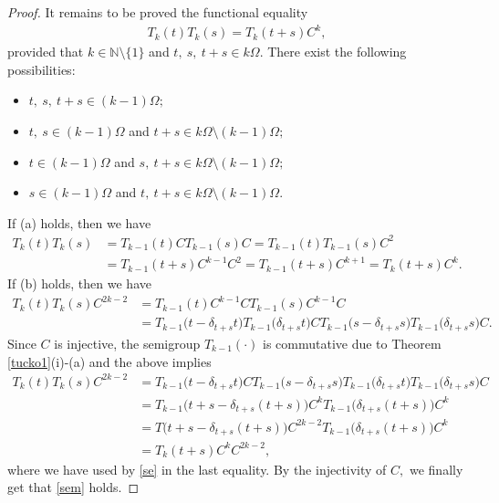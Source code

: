 \documentclass{amsart}
\theoremstyle{definition}
\theoremstyle{remark}
\numberwithin{equation}{section}
\begin{document}
\begin{proof}
It remains to be proved the functional equality
\begin{align}\label{sem}
T_{k}(t)T_{k}(s)=T_{k}(t+s)C^{k},
\end{align}
provided that $k\in {\mathbb N} \setminus \{1\}$ and $t,\ s,\ t+s\in k\Omega.$ There exist the following possibilities:
\begin{itemize}
\item[(a)] $t,\ s,\ t+s\in (k-1)\Omega;$
\item[(b)] $t,\ s\in (k-1)\Omega$ and $t+s\in k\Omega \setminus (k-1) \Omega;$
\item[(c)] $t \in (k-1)\Omega$ and $s,\ t+s\in k\Omega \setminus (k-1) \Omega;$
\item[(d)] $s\in (k-1)\Omega$ and $t,\ t+s\in k\Omega \setminus (k-1) \Omega.$
\end{itemize}
If (a) holds, then we have
\begin{align*}
T_{k}(t)T_{k}(s)& =T_{k-1}(t)C T_{k-1}(s)C=T_{k-1}(t)  T_{k-1}(s)C^{2}
\\& =T_{k-1}(t+s)C^{k-1}C^{2}=T_{k-1}(t+s)C^{k+1}=T_{k}(t+s)C^{k}.
\end{align*}
If (b) holds, then we have
\begin{align*}
T_{k}(t)T_{k}(s)C^{2k-2}&=T_{k-1}(t)C^{k-1} C T_{k-1}(s)C^{k-1} C\\&=T_{k-1}\bigl(t-\delta_{t+s}t \bigr)T_{k-1}\bigl(\delta_{t+s}t \bigr)CT_{k-1}\bigl(s-\delta_{t+s}s \bigr)T_{k-1}\bigl(\delta_{t+s}s \bigr)C.
\end{align*}
Since $C$ is injective, the semigroup $T_{k-1}(\cdot)$ is commutative due to Theorem \ref{tucko1}(i)-(a) and the above implies 
\begin{align*}
T_{k}(t)T_{k}(s)C^{2k-2}&=
T_{k-1}\bigl(t-\delta_{t+s}t \bigr)CT_{k-1}\bigl(s-\delta_{t+s}s \bigr)T_{k-1}\bigl(\delta_{t+s}t \bigr)T_{k-1}\bigl(\delta_{t+s}s \bigr)C
\\& =T_{k-1}\bigl(t+s-\delta_{t+s}(t+s)\bigr)C^{k}T_{k-1}\bigl(\delta_{t+s}(t+s)\bigr)C^{k} 
\\& = T \bigl(t+s-\delta_{t+s}(t+s)\bigr)C^{2k-2}T_{k-1}\bigl(\delta_{t+s}(t+s)\bigr)C^{k} 
\\& =T_{k}(t+s)C^{k}C^{2k-2},
\end{align*}
where we have used by \eqref{se} in the last equality.
By the injectivity of $C,$ we finally get that \eqref{sem} holds.


\end{proof}
\end{document}
